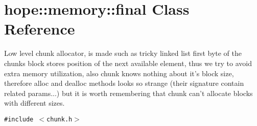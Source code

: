\hypertarget{structhope_1_1memory_1_1final}{
\section{hope::memory::final Class Reference}
\label{structhope_1_1memory_1_1final}
}
Low level chunk allocator, is made such as tricky linked list first byte of the chunks block stores position of the next available element, thus we try to avoid extra memory utilization, also chunk knows nothing about it's block size, therefore alloc and dealloc methods looks so strange (their signature contain related params...) but it is worth remembering that chunk can't allocate blocks with different sizes.  


{\tt \#include $<$chunk.h$>$}

